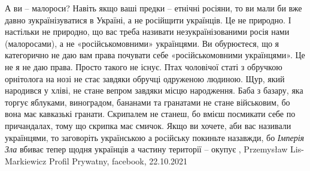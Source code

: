 А ви – малороси? Навіть якщо ваші предки – етнічні росіяни, то ви мали би вже
давно зукраїнізуватися в Україні, а не російщити українців. Це не природно. І
настільки не природно, що вас треба називати незукраїнізованими росія­ нами
(малоросами), а не «російськомовними» українцями. Ви обурюєтеся, що я
категорично не даю вам права почувати себе «російськомовними українцями». Це
не я не даю права. Просто такого не існує. Птах чоловічої статі з обручкою
орнітолога на нозі не стає завдяки обручці одруженою людиною. Щур, який
народився у хліві, не стане вепром завдяки місцю народження. Баба з базару, яка
торгує яблуками, виноградом, бананами та гранатами не стане військовим, бо вона
має кавказькі гранати. Скрипалем не станеш, бо вмієш посмикати себе по
причандалах, тому що скрипка має смичок. Якщо ви хочете, аби вас називали
українцями, то заговоріть українською а російську покиньте назавжди, бо
\emph{Імперія Зла} вбиває тепер щодня українців а частину території – окупує
, Przemysław Lis-Markiewicz Profil Prywatny, %
facebook, 22.10.2021
